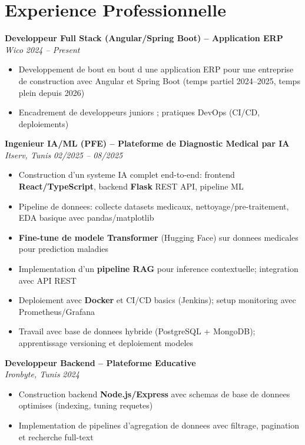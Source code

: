 \documentclass[10pt,a4paper]{article}
\begin{document}
\section*{Experience Professionnelle}
{\small

\textbf{Developpeur Full Stack (Angular/Spring Boot) -- Application ERP}\\[1pt]
\textit{Wico} \hfill \textit{2024 -- Present}
\begin{itemize}
  \item Developpement de bout en bout d une application ERP pour une entreprise de construction avec Angular et Spring Boot (temps partiel 2024--2025, temps plein depuis 2026)
  \item Encadrement de developpeurs juniors ; pratiques DevOps (CI/CD, deploiements)
\end{itemize}

\vspace{3pt}
\textbf{Ingenieur IA/ML (PFE) -- Plateforme de Diagnostic Medical par IA}\\[1pt]
\textit{Itserv, Tunis} \hfill \textit{02/2025 -- 08/2025}
\begin{itemize}
  \item Construction d'un systeme IA complet end-to-end: frontend \textbf{React/TypeScript}, backend \textbf{Flask} REST API, pipeline ML
  \item Pipeline de donnees: collecte datasets medicaux, nettoyage/pre-traitement, EDA basique avec pandas/matplotlib
  \item \textbf{Fine-tune de modele Transformer} (Hugging Face) sur donnees medicales pour prediction maladies
  \item Implementation d'un \textbf{pipeline RAG} pour inference contextuelle; integration avec API REST
  \item Deploiement avec \textbf{Docker} et CI/CD basics (Jenkins); setup monitoring avec Prometheus/Grafana
  \item Travail avec base de donnees hybride (PostgreSQL + MongoDB); apprentissage versioning et deploiement modeles
\end{itemize}

\vspace{3pt}
\textbf{Developpeur Backend -- Plateforme Educative}\\[1pt]
\textit{Ironbyte, Tunis} \hfill \textit{2024}
\begin{itemize}
  \item Construction backend \textbf{Node.js/Express} avec schemas de base de donnees optimises (indexing, tuning requetes)
  \item Implementation de pipelines d'agregation de donnees avec filtrage, pagination et recherche full-text
\end{itemize}

}
\end{document}
